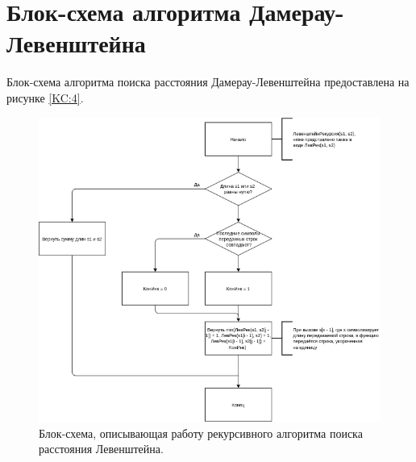 \documentclass[12pt]{report}
\begin{document}
\section{Блок-схема алгоритма Дамерау-Левенштейна}
Блок-схема алгоритма поиска расстояния Дамерау-Левенштейна предоставлена на рисунке \ref{KC:4}.
\begin{figure}
\begin{center}

\includegraphics[scale=0.75]{inc/img/LevRec.png}{}
\captionsetup{justification=centering}
	\caption{Блок-схема, описывающая работу рекурсивного алгоритма поиска расстояния Левенштейна.}
	\label{KC:1}
\end{center}
\end{figure}
\end{document}
